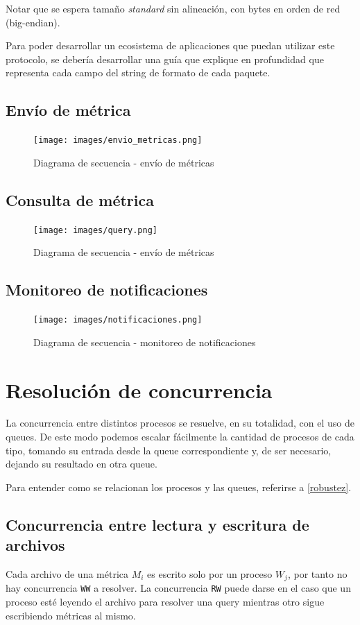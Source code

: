 \documentclass[titlepage,a4paper,oneside]{article}
\begin{document}
Notar que se espera tamaño \textit{standard} sin alineación, con bytes en orden de red (big-endian).

Para poder desarrollar un ecosistema de aplicaciones que puedan utilizar este protocolo, se debería desarrollar una guía que explique en profundidad que representa cada campo del string de formato de cada paquete.

\subsection{Envío de métrica}
\begin{figure}[H]
\centering
\texttt{[image: images/envio\_metricas.png]}
\caption{Diagrama de secuencia \-- envío de métricas}
\end{figure}

\subsection{Consulta de métrica}
\begin{figure}[H]
\centering
\texttt{[image: images/query.png]}
\caption{Diagrama de secuencia \-- envío de métricas}
\end{figure}

\subsection{Monitoreo de notificaciones}
\begin{figure}[H]
\centering
\texttt{[image: images/notificaciones.png]}
\caption{Diagrama de secuencia \-- monitoreo de notificaciones}
\end{figure}

\section{Resolución de concurrencia}
La concurrencia entre distintos procesos se resuelve, en su totalidad, con el uso de queues. De este modo podemos escalar fácilmente la cantidad de procesos de cada tipo, tomando su entrada desde la queue correspondiente y, de ser necesario, dejando su resultado en otra queue.

Para entender como se relacionan los procesos y las queues, referirse a \ref{robustez}.

\subsection{Concurrencia entre lectura y escritura de archivos}
Cada archivo de una métrica $M_i$ es escrito solo por un proceso $W_j$, por tanto no hay concurrencia \texttt{WW} a resolver. La concurrencia \texttt{RW} puede darse en el caso que un proceso esté leyendo el archivo para resolver una query mientras otro sigue escribiendo métricas al mismo.
\end{document}
